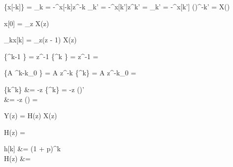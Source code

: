 
\begin{abox}
	\{x[-k]\} = \sum_{k = -\infty}^{\infty}x[-k]z^{-k}  \sum_{k' = -\infty}^{\infty}x[k']z^{k'} = \sum_{k' = -\infty}^{\infty}x[k'] \cdot \left(\right)^{-k'} = X\left(\right)
\end{abox}

\begin{abox}
	x[0] = \lim\limits_{z \rightarrow \infty} X(z)
\end{abox}

\begin{abox}
	\lim\limits_{k\rightarrow\infty}x[k] = \lim\limits_{z}(z - 1) \cdot X(z)
\end{abox}

\begin{abox}
	\{\alpha^{k-1} \cdot \epsilon[k-1]\} = z^{-1} \cdot {}\{\alpha^k \cdot \epsilon[k]\} = z^{-1} \cdot {} = 
\end{abox}

\begin{abox}
	\{A \cdot\alpha^{k-k_0} \cdot\epsilon[k - k_0]\} = A \cdot z^{-k} \cdot {}\{\alpha^k\epsilon[k]\} = A \cdot z^{-k_0} \cdot {} = 
\end{abox}

\begin{abox}
	\{k\cdot\alpha^k\cdot\epsilon[k]\} &= -z \cdot {}\{\alpha^k\epsilon[k]\} = -z \cdot \left(\right)' \\
	&= -z \cdot \left(\right) = 
\end{abox}

\begin{abox}
	Y(z) = H(z) \cdot X(z)
\end{abox}

\begin{abox}
	H(z) = 
\end{abox}

\begin{abox}
	h[k] &= (1 + p)^k \cdot \epsilon[k]\\
	H(z) &= 
\end{abox}

